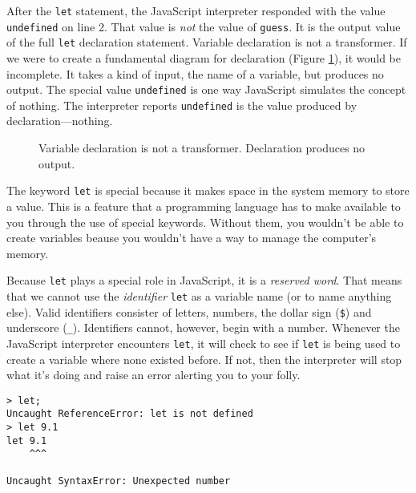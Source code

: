 After the \texttt{let} statement, the JavaScript interpreter responded with the value \texttt{undefined} on line 2. That value is \textit{not} the value of \texttt{guess}. It is the output value of the full \texttt{let} declaration statement. Variable declaration is not a transformer. If we were to create a fundamental diagram for declaration (Figure \ref{fig:intro-declaration-fundamental-diagram}), it would be incomplete. It takes a kind of input, the name of a variable, but produces no output. The special value \texttt{undefined} is one way JavaScript simulates the concept of nothing. The interpreter reports \texttt{undefined} is the value produced by declaration---nothing.

\begin{figure}[h]
  
  \caption{\label{fig:intro-declaration-fundamental-diagram}Variable declaration is not a transformer. Declaration produces no output.}
\end{figure}

The keyword \texttt{let} is special because it makes space in the system memory to store a value. This is a feature that a programming language has to make available to you through the use of special keywords. Without them, you wouldn't be able to create variables beause you wouldn't have a way to manage the computer's memory.

Because \texttt{let} plays a special role in JavaScript, it is a \emph{reserved word}. That means that we cannot use the \emph{identifier} \texttt{let} as a variable name (or to name anything else). Valid identifiers consister of letters, numbers, the dollar sign (\texttt{\$}) and underscore (\texttt{\_}). Identifiers cannot, however, begin with a number.  Whenever the JavaScript interpreter encounters \texttt{let}, it will check to see if \texttt{let} is being used to create a variable where none existed before. If not, then the interpreter will stop what it's doing and raise an error alerting you to your folly.

\begin{lstlisting}[caption={\label{listing:intro-let-syntax-error}Several illegal uses of the keyword \texttt{let}.}]
> let;
Uncaught ReferenceError: let is not defined
> let 9.1
let 9.1
    ^^^

Uncaught SyntaxError: Unexpected number
\end{lstlisting}


